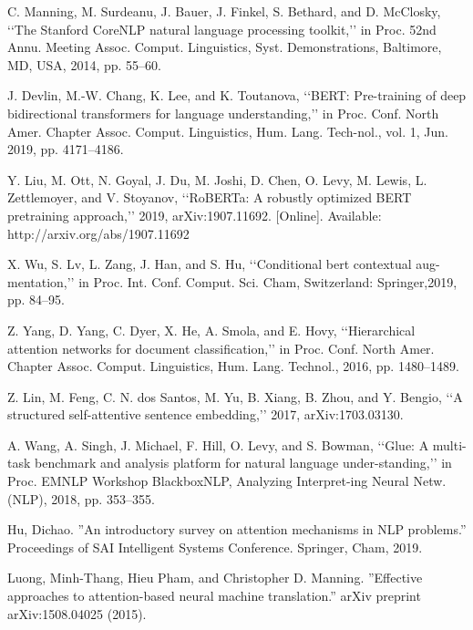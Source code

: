 \documentclass[conference]{IEEEtran}
\begin{document}
\begin{thebibliography}{00}
 C. Manning, M. Surdeanu, J. Bauer, J. Finkel, S. Bethard, and D. McClosky, ‘‘The Stanford CoreNLP natural language processing toolkit,’’ in Proc. 52nd Annu. Meeting Assoc. Comput. Linguistics, Syst. Demonstrations, Baltimore, MD, USA, 2014, pp. 55–60.

 J. Devlin, M.-W. Chang, K. Lee, and K. Toutanova, ‘‘BERT: Pre-training of deep bidirectional transformers for language understanding,’’ in Proc. Conf. North Amer. Chapter Assoc. Comput. Linguistics, Hum. Lang. Tech-nol., vol. 1, Jun. 2019, pp. 4171–4186.

 Y. Liu, M. Ott, N. Goyal, J. Du, M. Joshi, D. Chen, O. Levy, M. Lewis, L. Zettlemoyer, and V. Stoyanov, ‘‘RoBERTa: A robustly optimized BERT pretraining approach,’’ 2019, arXiv:1907.11692. [Online]. Available: http://arxiv.org/abs/1907.11692

 X. Wu, S. Lv, L. Zang, J. Han, and S. Hu, ‘‘Conditional bert contextual aug-mentation,’’ in Proc. Int. Conf. Comput. Sci. Cham, Switzerland: Springer,2019, pp. 84–95.

 Z. Yang, D. Yang, C. Dyer, X. He, A. Smola, and E. Hovy, ‘‘Hierarchical attention networks for document classification,’’ in Proc. Conf. North Amer. Chapter Assoc. Comput. Linguistics, Hum. Lang. Technol., 2016, pp. 1480–1489.

 Z. Lin, M. Feng, C. N. dos Santos, M. Yu, B. Xiang, B. Zhou, and Y. Bengio, ‘‘A structured self-attentive sentence embedding,’’ 2017, arXiv:1703.03130.

 A. Wang, A. Singh, J. Michael, F. Hill, O. Levy, and S. Bowman, ‘‘Glue: A multi-task benchmark and analysis platform for natural language under-standing,’’ in Proc. EMNLP Workshop BlackboxNLP, Analyzing Interpret-ing Neural Netw. (NLP), 2018, pp. 353–355.

 Hu, Dichao. ”An introductory survey on attention mechanisms in NLP problems.” Proceedings of SAI Intelligent Systems Conference. Springer, Cham, 2019.

 Luong, Minh-Thang, Hieu Pham, and Christopher D. Manning. ”Effective approaches to attention-based neural machine translation.” arXiv preprint arXiv:1508.04025 (2015).
\end{thebibliography}
\vspace{12pt}
\color{red}
\end{document}
